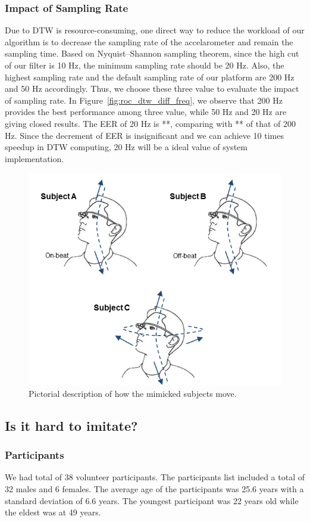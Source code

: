 \subsubsection{Impact of Sampling Rate}
Due to DTW is resource-consuming, one direct way to reduce the workload of our algorithm is to decrease the sampling rate of the accelarometer and remain the sampling time. Based on Nyquist–Shannon sampling theorem, since the high cut of our filter is 10 Hz, the minimum sampling rate should be 20 Hz. Also, the highest sampling rate and the default sampling rate of our platform are 200 Hz and 50 Hz accordingly. Thus, we choose these three value to evaluate the impact of sampling rate.  In Figure~\ref{fig:roc_dtw_diff_freq}, we observe that 200 Hz provides the best performance among three value, while 50 Hz and 20 Hz are giving closed results. The EER of 20 Hz is **, comparing with  ** of that of 200 Hz. Since the decrement of EER is insignificant and we can achieve 10 times speedup in DTW computing,  20 Hz will be a ideal value of system implementation. 
\begin{figure}
\centering
\includegraphics[width = \columnwidth]{figure/imitation_subject_movement.png}
\caption{\label{fig:imitation_movement} Pictorial description of how the mimicked subjects move.}
\end{figure}
\subsection{Is it hard to imitate?}
\subsubsection{Participants}
We had total of 38 volunteer participants. The participants list included a total of 32 males and 6 females. 
The average age of the participants was 25.6 years with a standard deviation 
of 6.6 years. The youngest participant was 22 years old while the eldest was 
at 49 years.
